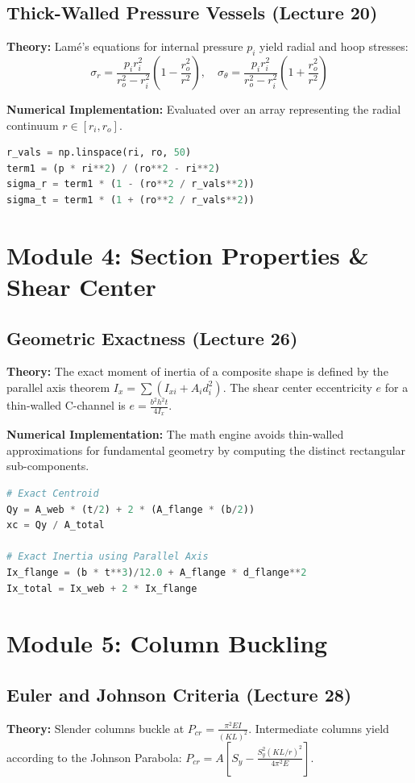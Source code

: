 \documentclass[11pt, a4paper]{article}
\begin{document}
\subsection{Thick-Walled Pressure Vessels (Lecture 20)}
\textbf{Theory:} Lam\'{e}'s equations for internal pressure $p_i$ yield radial and hoop stresses:
\begin{equation}
\sigma_r = \frac{p_i r_i^2}{r_o^2 - r_i^2} \left(1 - \frac{r_o^2}{r^2}\right), \quad \sigma_\theta = \frac{p_i r_i^2}{r_o^2 - r_i^2} \left(1 + \frac{r_o^2}{r^2}\right)
\end{equation}

\textbf{Numerical Implementation:}
Evaluated over an array representing the radial continuum $r \in [r_i, r_o]$.
\begin{lstlisting}[language=Python]
r_vals = np.linspace(ri, ro, 50)
term1 = (p * ri**2) / (ro**2 - ri**2)
sigma_r = term1 * (1 - (ro**2 / r_vals**2))
sigma_t = term1 * (1 + (ro**2 / r_vals**2))
\end{lstlisting}

\section{Module 4: Section Properties \& Shear Center}
\subsection{Geometric Exactness (Lecture 26)}
\textbf{Theory:} The exact moment of inertia of a composite shape is defined by the parallel axis theorem $I_x = \sum (I_{xi} + A_i d_i^2)$. The shear center eccentricity $e$ for a thin-walled C-channel is $e = \frac{b^2 h^2 t}{4 I_x}$.

\textbf{Numerical Implementation:}
The math engine avoids thin-walled approximations for fundamental geometry by computing the distinct rectangular sub-components.
\begin{lstlisting}[language=Python]
# Exact Centroid
Qy = A_web * (t/2) + 2 * (A_flange * (b/2))
xc = Qy / A_total

# Exact Inertia using Parallel Axis
Ix_flange = (b * t**3)/12.0 + A_flange * d_flange**2
Ix_total = Ix_web + 2 * Ix_flange
\end{lstlisting}

\section{Module 5: Column Buckling}
\subsection{Euler and Johnson Criteria (Lecture 28)}
\textbf{Theory:} Slender columns buckle at $P_{cr} = \frac{\pi^2 EI}{(KL)^2}$. Intermediate columns yield according to the Johnson Parabola: $P_{cr} = A \left[ S_y - \frac{S_y^2 (KL/r)^2}{4 \pi^2 E} \right]$.
\end{document}
